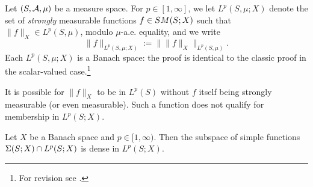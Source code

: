 \begin{defn}
  Let $(S,\mathcal{A},\mu)$ be a measure space.
  For $p \in [1,\infty]$, we let $L^p(S,\mu;X)$ denote the set of \emph{strongly} measurable functions $f \in SM(S;X)$ such that $\|f\|_X \in L^p(S,\mu)$, modulo $\mu$-a.e. equality, and we write
  \begin{equation*}
    \|f\|_{L^p(S,\mu;X)} := \| \|f\|_X \|_{L^p(S,\mu)}.
  \end{equation*}
  Each $L^p(S,\mu;X)$ is a Banach space: the proof is identical to the classic proof in the scalar-valued case.\footnote{For revision see \cite[Theorem 5.2.1]{rD04}.}
\end{defn}

\begin{rmk}
  It is possible for $\|f\|_X$ to be in $L^p(S)$ without $f$ itself being strongly measurable (or even measurable).
  Such a function does not qualify for membership in $L^p(S;X)$.
\end{rmk}

\begin{prop}\label{prop:simple-density}
  Let $X$ be a Banach space and $p \in [1,\infty)$.
  Then the subspace of simple functions $\Sigma(S;X) \cap L^p(S;X)$ is dense in $L^p(S;X)$.
\end{prop}

